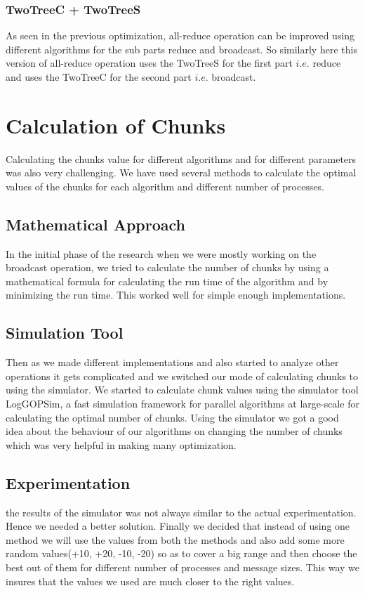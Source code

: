 \documentclass[sigplan,review,anonymous]{acmart}\settopmatter{printfolios=true,printccs=false,printacmref=false}
\begin{document}
\subsubsection{TwoTreeC + TwoTreeS}
As seen in the previous optimization, all-reduce operation can be improved using different algorithms for the sub parts reduce and broadcast. So similarly here this version of all-reduce operation uses the TwoTreeS for the first part $i.e.$ reduce and uses the TwoTreeC for the second part $i.e.$ broadcast.

\section{Calculation of Chunks}\label{sec:Chunks}
Calculating the chunks value for different algorithms and for different parameters was also very challenging. We have used several methods to calculate the optimal values of the chunks for each algorithm and different number of processes.
\subsection{Mathematical Approach}
In the initial phase of the research when we were mostly working on the broadcast operation, we tried to calculate the number of chunks by using a mathematical formula for calculating the run time of the algorithm and by minimizing the run time. This worked well for simple enough implementations.
\subsection{Simulation Tool}
Then as we made different implementations and also started to analyze other operations it gets complicated and we switched our mode of calculating chunks to using the simulator. We started to calculate chunk values using the simulator tool LogGOPSim, a fast simulation framework for parallel algorithms at large-scale for calculating the optimal number of chunks. Using the simulator we got a good idea about the behaviour of our algorithms on changing the number of chunks which was very helpful in making many optimization.
\subsection{Experimentation}
the results of the simulator was not always similar to the actual experimentation. Hence we needed a better solution. Finally we decided that instead of using one method we will use the values from both the methods and also add some more random values(+10, +20, -10, -20) so as to cover a big range and then choose the best out of them for different number of processes and message sizes. This way we insures that the values we used are much closer to the right values.
\end{document}

